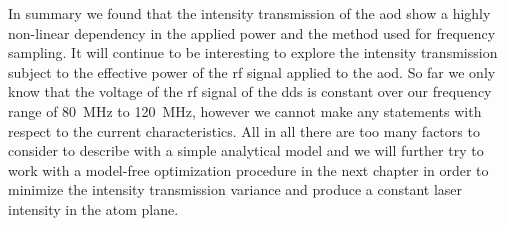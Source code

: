 In summary we found that the intensity transmission of the \gls{aod} show a
highly non-linear dependency in the applied power and the method used for
frequency sampling. It will continue to be interesting to explore the
intensity transmission subject to the effective power of the \gls{rf} signal
applied to the \gls{aod}. So far we only know that the voltage of the \gls{rf}
signal of the \gls{dds} is constant over our frequency range of
\SI{80}{\mega\hertz} to \SI{120}{\mega\hertz}, however we cannot make any
statements with respect to the current characteristics. All in all there are
too many factors to consider to describe with a simple analytical model and we
will further try to work with a model-free optimization procedure in the next
chapter in order to minimize the intensity transmission variance and produce
a constant laser intensity in the atom plane.
